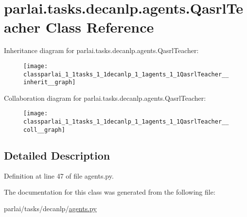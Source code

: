 \hypertarget{classparlai_1_1tasks_1_1decanlp_1_1agents_1_1QasrlTeacher}{}\section{parlai.\+tasks.\+decanlp.\+agents.\+Qasrl\+Teacher Class Reference}
\label{classparlai_1_1tasks_1_1decanlp_1_1agents_1_1QasrlTeacher}


Inheritance diagram for parlai.\+tasks.\+decanlp.\+agents.\+Qasrl\+Teacher\+:
\nopagebreak
\begin{figure}[H]
\begin{center}
\leavevmode
\texttt{[image: classparlai\_1\_1tasks\_1\_1decanlp\_1\_1agents\_1\_1QasrlTeacher\_\_inherit\_\_graph]}
\end{center}
\end{figure}


Collaboration diagram for parlai.\+tasks.\+decanlp.\+agents.\+Qasrl\+Teacher\+:
\nopagebreak
\begin{figure}[H]
\begin{center}
\leavevmode
\texttt{[image: classparlai\_1\_1tasks\_1\_1decanlp\_1\_1agents\_1\_1QasrlTeacher\_\_coll\_\_graph]}
\end{center}
\end{figure}


\subsection{Detailed Description}


Definition at line 47 of file agents.\+py.



The documentation for this class was generated from the following file\+:\begin{DoxyCompactItemize}
\item 
parlai/tasks/decanlp/\hyperlink{parlai_2tasks_2decanlp_2agents_8py}{agents.\+py}\end{DoxyCompactItemize}
